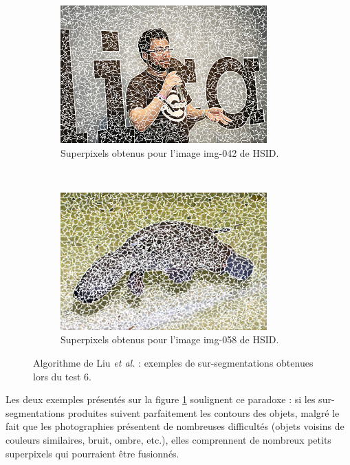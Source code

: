   \begin{figure}[htb]
	\centering
	 \begin{subfigure}[t]{0.45\textwidth}	
			\includegraphics[width=\textwidth]{images/sur-segmentation/ERS/EX1-img-042}
		 	\caption{Superpixels obtenus pour l'image img-042 de HSID.}
	\end{subfigure}
 ~
	 \begin{subfigure}[t]{0.45\textwidth}	
			\includegraphics[width=\textwidth]{images/sur-segmentation/ERS/EX2-img-058}
		 	\caption{Superpixels obtenus pour l'image img-058 de HSID.}
	\end{subfigure}
	\caption{Algorithme de Liu \textit{et al.} : exemples de sur-segmentations obtenues lors du test 6. }
	\label{fig:sp:exers1}
\end{figure}
 

 Les deux exemples présentés sur la figure \ref{fig:sp:exers1} soulignent ce paradoxe : si les sur-segmentations produites suivent parfaitement les contours des objets, malgré le fait que les photographies présentent de nombreuses difficultés (objets voisins de couleurs similaires, bruit, ombre, etc.), elles comprennent de nombreux petits superpixels qui pourraient être fusionnés. 
 
